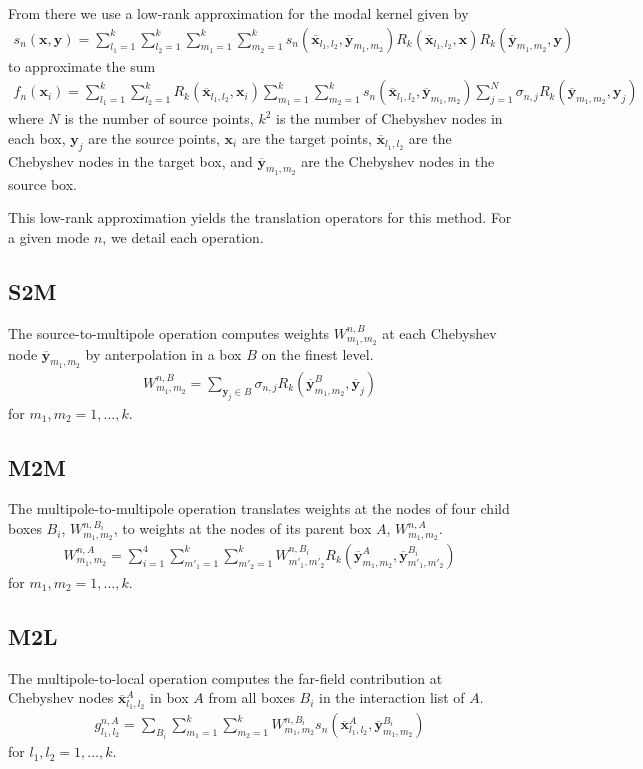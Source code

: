 \documentclass[11pt, oneside]{article}   	%
\begin{document}
From there we use a low-rank approximation for the modal kernel given by
\begin{align}
s_n(\mathbf{x},\mathbf{y}) = \sum_{l_1=1}^k\sum_{l_2=1}^k\sum_{m_1=1}^k\sum_{m_2=1}^k s_n(\mathbf{\overline{x}}_{l_1,l_2},\mathbf{\overline{y}}_{m_1,m_2})R_k(\mathbf{\overline{x}}_{l_1,l_2},\mathbf{x})R_k(\mathbf{\overline{y}}_{m_1,m_2},\mathbf{y})
\end{align}
to approximate the sum
\begin{align}
f_n(\mathbf{x}_i)=\sum_{l_1=1}^k \sum_{l_2=1}^k R_k(\mathbf{\overline{x}}_{l_1,l_2},\mathbf{x}_i) \sum_{m_1=1}^k \sum_{m_2=1}^k s_n(\mathbf{\overline{x}}_{l_1,l_2},\mathbf{\overline{y}}_{m_1,m_2}) \sum_{j=1}^N \sigma_{n,j}R_k(\mathbf{\overline{y}}_{m_1,m_2},\mathbf{y}_j)
\end{align}
where $N$ is the number of source points, $k^2$ is the number of Chebyshev nodes in each box, $\mathbf{y}_j$ are the source points, $\mathbf{x}_i$ are the target points, $\mathbf{\overline{x}}_{l_1,l_2}$ are the Chebyshev nodes in the target box, and $\mathbf{\overline{y}}_{m_1,m_2}$ are the Chebyshev nodes in the source box.

This low-rank approximation yields the translation operators for this method. For a given mode $n$, we detail each operation.
\subsection{S2M}
The source-to-multipole operation computes weights $W^{n,B}_{m_1,m_2}$ at each Chebyshev node $\mathbf{\overline{y}}_{m_1,m_2}$ by anterpolation in a box $B$ on the finest level.
\begin{align}
W_{m_1,m_2}^{n,B} = \sum_{\mathbf{y}_j\in B} \sigma_{n,j} R_k(\mathbf{\overline{y}}^B_{m_1,m_2},\mathbf{\overline{y}}_j)
\end{align}
for $m_1,m_2 = 1,\dots,k$.
\subsection{M2M}
The multipole-to-multipole operation translates weights at the nodes of four child boxes $B_i$, $W_{m_1,m_2}^{n,B_i}$, to weights at the nodes of its parent box $A$, $W_{m_1,m_2}^{n,A}$.
\begin{align}
W_{m_1,m_2}^{n,A} = \sum_{i=1}^4 \sum_{m'_1=1}^k\sum_{m'_2=1}^k W_{m'_1,m'_2}^{n,B_i} R_k(\mathbf{\overline{y}}^A_{m_1,m_2},\mathbf{\overline{y}}^{B_i}_{m'_1,m'_2})
\end{align}
for $m_1,m_2= 1,\dots,k$.
\subsection{M2L}
The multipole-to-local operation computes the far-field contribution at Chebyshev nodes $\mathbf{\overline{x}}_{l_1,l_2}^A$ in box $A$ from all boxes $B_i$ in the interaction list of $A$.
\begin{align}
g_{l_1,l_2}^{n,A} = \sum_{B_i} \sum_{m_1=1}^k\sum_{m_2=1}^k W_{m_1,m_2}^{n,B_i} s_n(\mathbf{\overline{x}}^{A}_{l_1,l_2},\mathbf{\overline{y}}^{B_i}_{m_1,m_2})
\end{align}
for $l_1,l_2 = 1,\dots,k$.
\end{document}
